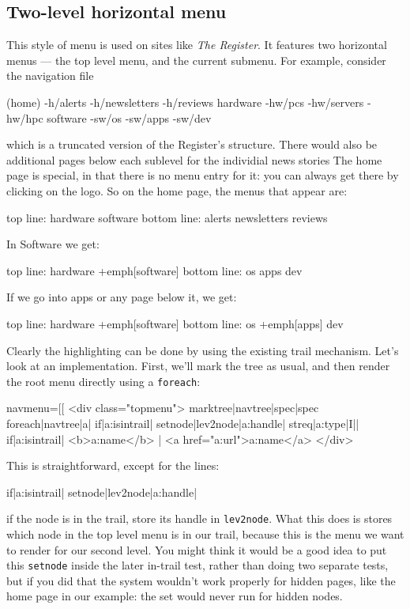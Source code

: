 \subsection{Two-level horizontal menu}
This style of menu is used on sites like \emph{The Register}. It features two horizontal
menus --- the top level menu, and the current submenu. For example, consider the navigation file
\begin{MyVerbatim}
(home)
-h/alerts
-h/newsletters
-h/reviews
hardware
-hw/pcs
-hw/servers
-hw/hpc
software
-sw/os
-sw/apps
-sw/dev
\end{MyVerbatim}
which is a truncated version of the Register's structure. There would also be additional pages
below each sublevel for the individial news stories The home page is special, in that there
is no menu entry for it: you can always get there by clicking on the logo. So on the home page,
the menus that appear are:
\begin{MyVerbatim}[commandchars=+\[\]]
top line:    hardware   software
bottom line: alerts newsletters reviews
\end{MyVerbatim}
In Software we get:
\begin{MyVerbatim}[commandchars=+\[\]]
top line:    hardware   +emph[software]
bottom line: os apps dev
\end{MyVerbatim}
If we go into apps or any page below it, we get:
\begin{MyVerbatim}[commandchars=+\[\]]
top line:    hardware   +emph[software]
bottom line: os +emph[apps] dev
\end{MyVerbatim}
Clearly the highlighting can be done by using the existing trail mechanism. Let's look at an
implementation. First, we'll mark the tree as usual, and then render the root menu directly using
a \texttt{foreach}:
\begin{MyVerbatim}
navmenu=[[
    <div class="topmenu">
    {{marktree|{{navtree}}|spec|{{spec}}}}
    {{foreach|{{navtree}}|a|
        {{if|{{a:isintrail}}|
            {{setnode|lev2node|{{a:handle}}}}|}}
        {{streq|{{a:type}}|I||
            {{if|{{a:isintrail}}|
                <b>{{a:name}}</b>
                |
                <a href="{{a:url}}">{{a:name}}</a>
            }}
        }}
    }}
    </div>
\end{MyVerbatim}
This is straightforward, except for the  lines: 
\begin{MyVerbatim}
        {{if|{{a:isintrail}}|
            {{setnode|lev2node|{{a:handle}}}}|}}
\end{MyVerbatim}
if the node is in the trail, store
its handle in \texttt{lev2node}. What this does is stores which node in the top level menu is
in our trail, because this is the menu we want to render for our second level. You might think
it would be a good idea to put this \texttt{setnode} inside the later in-trail test, rather
than doing two separate tests, but if you did that the system wouldn't work properly for hidden
pages, like the home page in our example: the set would never run for hidden nodes.

